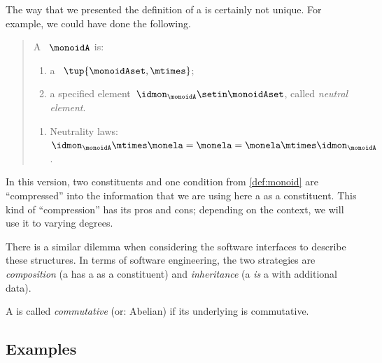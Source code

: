 \begin{remark}
    The way that we presented the definition of a  is certainly not unique.
    For example, we could have done the following.
    \begin{quote}
        A ~$\monoidA$ is:
        \begin{body}
            \constit
            \begin{enumerate}
                \item a ~$\tup{\monoidAset, \mtimes}$;
                \item a specified element~$\idmon_\monoidA \setin \monoidAset$, called \emph{neutral element}.
            \end{enumerate}
            \condit
            \begin{enumerate}
                \item Neutrality laws:~$\idmon_\monoidA \mtimes \monela= \monela= \monela \mtimes \idmon_\monoidA$.
            \end{enumerate}
        \end{body}
    \end{quote}
    In this version, two constituents and one condition from \cref{def:monoid} are ``compressed'' into the information that we are using here a  as a constituent.
    This kind of ``compression'' has its pros and cons; depending on the context, we will use it to varying degrees.

    There is a similar dilemma when considering the software interfaces to describe these structures.
    In terms of software engineering, the two strategies are \emph{composition} (a  has a  as a constituent) and \emph{inheritance} (a  \emph{is} a  with additional data).

\end{remark}


\begin{remark}
    A  is called \emph{commutative} (or: Abelian) if its underlying  is commutative.
\end{remark}

\subsection{Examples}


